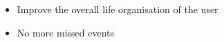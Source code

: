 \begin{itemize}
\item Improve the overall life organisation of the user
\item No more missed events
\end{itemize}